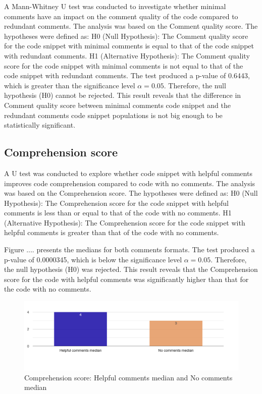 A Mann-Whitney U test was conducted to investigate whether minimal comments have an impact on the comment quality of the code compared to redundant comments. The analysis was based on the Comment quality score. The hypotheses were defined as: H0 (Null Hypothesis): The Comment quality score for the code snippet with minimal comments is equal to that of the code snippet with redundant comments. H1 (Alternative Hypothesis): The Comment quality score for the code snippet with minimal comments is not equal to that of the code snippet with redundant comments.  The test produced a p-value of 0.6443, which is greater than the significance level $\alpha = 0.05$. Therefore, the null hypothesis (H0) cannot be rejected. This result reveals that the difference in Comment quality score between minimal comments code snippet and the redundant comments code snippet populations is not big enough to be statistically significant.


\subsection{Comprehension score}
A U test was conducted to explore whether code snippet with helpful comments improves code comprehension compared to code with no comments. The analysis was based on the Comprehension score. The hypotheses were defined as: H0 (Null Hypothesis): The Comprehension score for the code snippet with helpful comments is less than or equal to that of the code with no comments.  H1 (Alternative Hypothesis): The Comprehension score for the code snippet with helpful comments is greater than that of the code with no comments.


Figure .... presents the medians for both comments formats.
The test produced a p-value of  0.0000345, which is below the significance level $\alpha = 0.05$. Therefore, the null hypothesis (H0) was rejected.  This result reveals that the Comprehension score for the code with helpful comments was significantly higher than that for the code with no comments. 


\begin{figure} [H]
  \centering
  \includegraphics[scale=0.4]{figures/h-0-q3.png}
  \caption{Comprehension score:  Helpful comments median and No comments median}
  \label{fig:AnhangsChor}
\end{figure}




